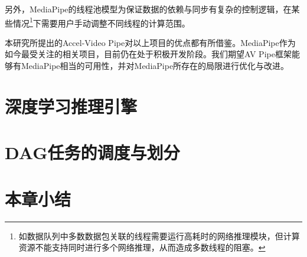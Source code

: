 另外，MediaPipe的线程池模型为保证数据的依赖与同步有复杂的控制逻辑，在某些情况\footnote{如数据队列中多数数据包关联的线程需要运行高耗时的网络推理模块，但计算资源不能支持同时进行多个网络推理，从而造成多数线程的阻塞。}下需要用户手动调整不同线程的计算范围。\par
本研究所提出的Accel-Video Pipe对以上项目的优点都有所借鉴。MediaPipe作为如今最受关注的相关项目，目前仍在处于积极开发阶段。我们期望AV Pipe框架能够有MediaPipe相当的可用性，并对MediaPipe所存在的局限进行优化与改进。\par
\section{深度学习推理引擎}\label{related:dl_engine}

\section{DAG任务的调度与划分}

\section{本章小结}
